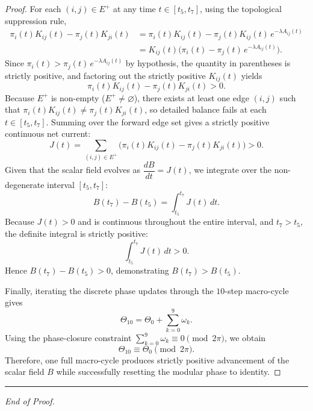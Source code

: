 \documentclass[11pt]{article}
\theoremstyle{plain}
\theoremstyle{definition}
\newcommand{\Efwd}{E^{+}}
\begin{document}
\begin{proof}
For each $(i,j) \in \Efwd$ at any time $t \in [t_5, t_7]$, using the topological
suppression rule,
\begin{align*}
  \pi_i(t) K_{ij}(t) - \pi_j(t) K_{ji}(t)
    &= \pi_i(t) K_{ij}(t) - \pi_j(t) K_{ij}(t)\, e^{-\lambda A_{ij}(t)} \\
    &= K_{ij}(t)\bigl( \pi_i(t) - \pi_j(t)\, e^{-\lambda A_{ij}(t)} \bigr).
\end{align*}
Since $\pi_i(t) > \pi_j(t)\, e^{-\lambda A_{ij}(t)}$ by hypothesis, the quantity
in parentheses is strictly positive, and factoring out the strictly positive
$K_{ij}(t)$ yields
\[
  \pi_i(t) K_{ij}(t) - \pi_j(t) K_{ji}(t) > 0.
\]
Because $\Efwd$ is non-empty ($\Efwd \neq \varnothing$), there exists at least
one edge $(i,j)$ such that $\pi_i(t) K_{ij}(t) \neq \pi_j(t) K_{ji}(t)$, so
detailed balance fails at each $t \in [t_5, t_7]$. Summing over the forward edge
set gives a strictly positive continuous net current:
\[
  J(t) = \sum_{(i,j) \in \Efwd}
         \bigl( \pi_i(t) K_{ij}(t) - \pi_j(t) K_{ji}(t) \bigr) > 0.
\]
Given that the scalar field evolves as $\dfrac{dB}{dt} = J(t)$, we integrate over
the non-degenerate interval $[t_5, t_7]$:
\[
  B(t_7) - B(t_5) = \int_{t_5}^{t_7} J(t)\, dt.
\]
Because $J(t) > 0$ and is continuous throughout the entire interval, and
$t_7 > t_5$, the definite integral is strictly positive:
\[
  \int_{t_5}^{t_7} J(t)\, dt > 0.
\]
Hence $B(t_7) - B(t_5) > 0$, demonstrating $B(t_7) > B(t_5)$.

Finally, iterating the discrete phase updates through the $10$-step macro-cycle
gives
\[
  \Theta_{10} = \Theta_0 + \sum_{k=0}^{9} \omega_k.
\]
Using the phase-closure constraint $\sum_{k=0}^{9} \omega_k \equiv 0 \pmod{2\pi}$,
we obtain
\[
  \Theta_{10} \equiv \Theta_0 \pmod{2\pi}.
\]
Therefore, one full macro-cycle produces strictly positive advancement of the
scalar field $B$ while successfully resetting the modular phase to identity.
\end{proof}

\bigskip
\noindent\rule{\linewidth}{0.4pt}
\begin{center}\small\itshape End of Proof.\end{center}
\end{document}
